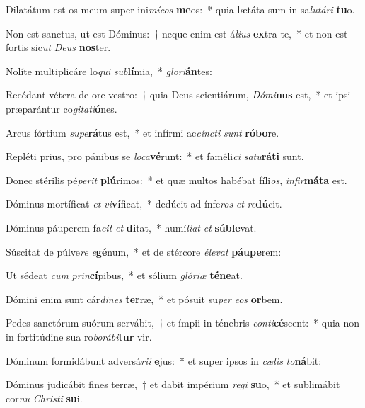 \item Dilatátum est os meum super ini\textit{mí}\textit{cos} \textbf{me}os:~* quia lætáta sum in sa\textit{lu}\textit{tá}\textit{ri} \textbf{tu}o.
\item Non est sanctus, ut est Dóminus:~† neque enim est á\textit{li}\textit{us} \textbf{ex}tra te,~* et non est fortis sic\textit{ut} \textit{De}\textit{us} \textbf{nos}ter.
\item Nolíte multiplicáre lo\textit{qui} \textit{sub}\textbf{lí}mia,~* \textit{glo}\textit{ri}\textbf{án}tes:
\item Recédant vétera de ore vestro:~† quia Deus scientiárum, \textit{Dó}\textit{mi}\textbf{nus} est,~* et ipsi præparántur co\textit{gi}\textit{ta}\textit{ti}\textbf{ó}nes.
\item Arcus fórtium \textit{su}\textit{pe}\textbf{rá}tus est,~* et infírmi ac\textit{cínc}\textit{ti} \textit{sunt} \textbf{ró}\textbf{bo}re.
\item Repléti prius, pro pánibus se \textit{lo}\textit{ca}\textbf{vé}runt:~* et faméli\textit{ci} \textit{sa}\textit{tu}\textbf{rá}\textbf{ti} sunt.
\item Donec stérilis pé\textit{pe}\textit{rit} \textbf{plú}rimos:~* et quæ multos habébat fíli\textit{os}, \textit{in}\textit{fir}\textbf{má}\textbf{ta} est.
\item Dóminus mortíficat \textit{et} \textit{vi}\textbf{ví}ficat,~* dedúcit ad ínfe\textit{ros} \textit{et} \textit{re}\textbf{dú}cit.
\item Dóminus páuperem fa\textit{cit} \textit{et} \textbf{di}tat,~* humí\textit{li}\textit{at} \textit{et} \textbf{súb}\textbf{le}vat.
\item Súscitat de púlve\textit{re} \textit{e}\textbf{gé}num,~* et de stércore \textit{é}\textit{le}\textit{vat} \textbf{páu}\textbf{pe}rem:
\item Ut sédeat \textit{cum} \textit{prin}\textbf{cí}pibus,~* et sólium \textit{gló}\textit{ri}\textit{æ} \textbf{té}\textbf{ne}at.
\item Dómini enim sunt cár\textit{di}\textit{nes} \textbf{ter}ræ,~* et pósuit su\textit{per} \textit{e}\textit{os} \textbf{or}bem.
\item Pedes sanctórum suórum servábit,~† et ímpii in ténebris \textit{con}\textit{ti}\textbf{cé}scent:~* quia non in fortitúdine sua ro\textit{bo}\textit{rá}\textit{bi}\textbf{tur} vir.
\item Dóminum formidábunt adversá\textit{ri}\textit{i} \textbf{e}jus:~* et super ipsos in \textit{cæ}\textit{lis} \textit{to}\textbf{ná}bit:
\item Dóminus judicábit fines terræ,~† et dabit impérium \textit{re}\textit{gi} \textbf{su}o,~* et sublimábit cor\textit{nu} \textit{Chris}\textit{ti} \textbf{su}i.
